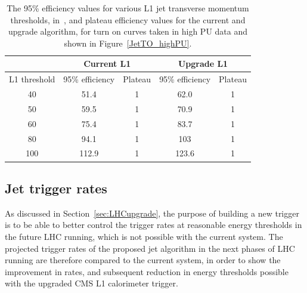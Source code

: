 \begin{table}[htb]   
    \begin{center}
        \caption{The 95\% efficiency values for various \ac{L1} jet transverse momentum thresholds, in~\GeV, and plateau efficiency values for the current and upgrade algorithm, for turn on curves taken in high \ac{PU} data and shown in Figure~\ref{JetTO_highPU}.}\label{tab:trigTO}
        {%
            \begin{tabular}{c|cc|cc} 
 &   \multicolumn{2}{c|}{Current L1} &  \multicolumn{2}{c}{Upgrade L1} \\ \hline 
         L1 threshold  & 95\% efficiency & Plateau & 95\% efficiency & Plateau \\ \hline
         40  & 51.4 & 1 & 62.0 & 1 \\
         50  & 59.5 & 1 & 70.9 & 1 \\
         60  & 75.4 & 1 & 83.7 & 1 \\
         80  & 94.1 & 1 & 103  & 1 \\
        100  & 112.9 & 1 & 123.6 & 1 \\
            \end{tabular}
        } 
    \end{center}
\end{table}


\subsection{Jet trigger rates}
As discussed in Section~\ref{sec:LHCupgrade}, the purpose of building a new trigger is to be able to better 
control the trigger rates at reasonable energy thresholds in the future \ac{LHC} running, which is not possible with the current system. 
The projected trigger rates of the proposed jet algorithm in the next phases of \ac{LHC} running are therefore compared to the current system, in order to show the improvement in rates, and subsequent reduction in energy thresholds possible with the upgraded \ac{CMS} \ac{L1} calorimeter trigger.


